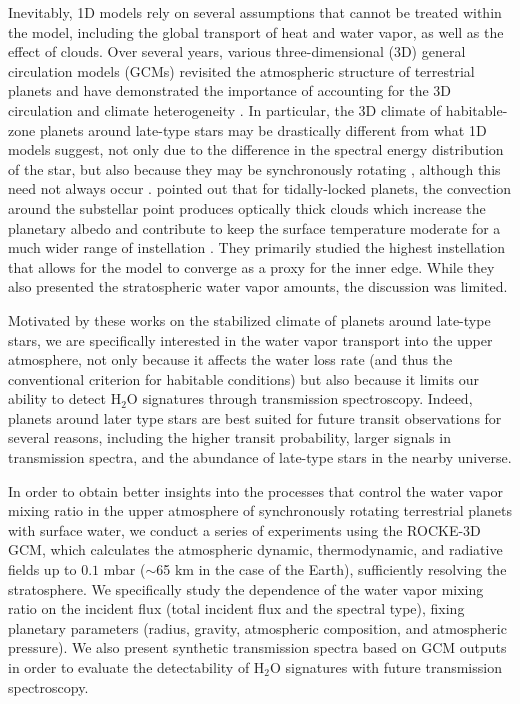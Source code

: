 \documentclass[11pt,numberedappendix,twocolappendix,]{emulateapj}
\def\water{H$_2$O}
\def\modelE{ROCKE-3D}
\def\wv{water vapor}
\begin{document}
Inevitably, 1D models rely on several assumptions that cannot be treated within the model, including the global transport of heat and water vapor, as well as the effect of clouds. 
Over several years, various three-dimensional (3D) general circulation models (GCMs) revisited the atmospheric structure of terrestrial planets and have demonstrated the importance of accounting for the 3D circulation and climate heterogeneity \citep[e.g.][]{Ishiwatari2002,Abe2011,Leconte2013a,Leconte2013b,Wolf2014,Wolf2015}. 
%
In particular, the 3D climate of habitable-zone planets around late-type stars may be drastically different from what 1D models suggest, not only due to the difference in the spectral energy distribution of the star, but also because they may be synchronously rotating \citep{Dole1964, Kasting1993}, although this need not always occur \citep{Goldreich1966,Leconte2015}.  
%
\citet{Yang2013} pointed out that for tidally-locked planets, the convection around the substellar point produces optically thick clouds which increase the planetary albedo and contribute to keep the surface temperature moderate for a much wider range of instellation \citep[see also][]{Yang2014,Way2015,Kopparapu2016}. 
They primarily studied the highest instellation that allows for the model to converge as a proxy for the inner edge. 
While they also presented the stratospheric water vapor amounts, the discussion was limited. 

Motivated by these works on the stabilized climate of planets around late-type stars, we are specifically interested in the \wv{} transport into the upper atmosphere, not only because it affects the water loss rate (and thus the conventional criterion for habitable conditions) but also because it limits our ability to detect \water{} signatures through transmission spectroscopy. 
%
Indeed, planets around later type stars are best suited for future transit observations for several reasons, including the higher transit probability, larger signals in transmission spectra, and the abundance of late-type stars in the nearby universe. 

In order to obtain better insights into the processes that control the \wv{}  mixing ratio in the upper atmosphere of synchronously rotating terrestrial planets with surface water, we conduct a series of experiments using the \modelE{} GCM, which calculates the atmospheric dynamic, thermodynamic, and radiative fields up to $0.1$ mbar ($\sim $65 km in the case of the Earth), sufficiently resolving the stratosphere. 
We specifically study the dependence of the \wv{} mixing ratio on the incident flux (total incident flux and the spectral type), fixing planetary parameters (radius, gravity, atmospheric composition, and atmospheric pressure). 
We also present synthetic transmission spectra based on GCM outputs in order to evaluate the detectability of \water{} signatures with future transmission spectroscopy. 
\end{document}
